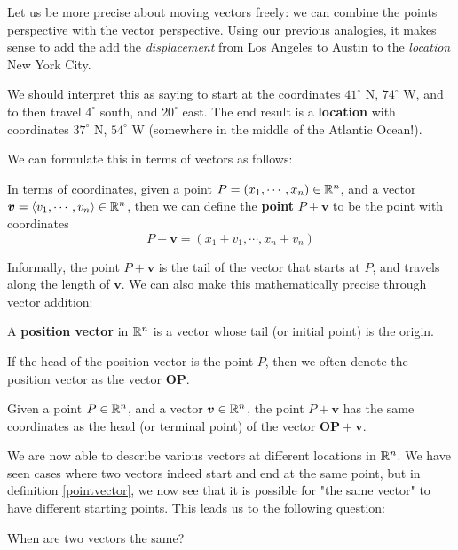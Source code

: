 Let us be more precise about moving vectors freely:  we can combine the points perspective with the vector perspective.  Using our previous analogies, it makes sense to add the add the \textit{displacement} from Los Angeles to Austin to the \textit{location} New York City.  

We should interpret this as saying to start at the coordinates $41^\circ$ N, $74^\circ$ W, and to then travel  $4^\circ$  south, and $20^\circ$ east.  The end result is a \textbf{location} with coordinates $37^\circ$ N, $54^\circ$ W (somewhere in the middle of the  Atlantic Ocean!).

We can formulate this in terms of vectors as follows:

\begin{definition}\label{pointvector}
In terms of coordinates, given a point $P = (x_1, \cdots, x_n) \in \mathbb{R}^n$, and a vector $\bm{v} = \langle v_1, \cdots, v_n \rangle \in \mathbb{R}^n$, then we can define the \textbf{point} $P + \bm{v}$ to be the point with coordinates $$P + \bm{v} = (x_1 + v_1 , \cdots, x_n + v_n)$$
\end{definition}

Informally, the point  $P + \bm{v}$ is the tail of the vector that starts at $P$, and travels along the length of $\bm{v}$. We can also make this mathematically precise through vector addition:

\begin{definition}
A \textbf{position vector} in $\mathbb{R}^n$ is a vector whose tail (or initial point) is the origin.

If the head of the position vector is the point $P$, then we often denote the position vector as the vector $\bm{OP}$.
\end{definition}


\begin{proposition}
Given a point $P \in \mathbb{R}^n$, and a vector $\bm{v}\in \mathbb{R}^n$, the point $P + \bm{v}$ has the same coordinates as the head (or terminal point) of the vector $\bm{OP} + \bm{v}$.    
\end{proposition}


We are now able to describe various vectors at different locations in $\mathbb{R}^n$.  We have seen cases where two vectors indeed start and end at the same point, but in definition \ref{pointvector}, we now see that it is possible for "the same vector" to have different starting points. This leads us to the following question:

\begin{motivating}
When are two vectors the same?
\end{motivating}

